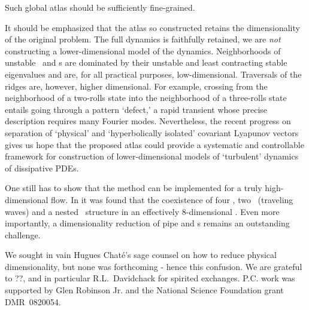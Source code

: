 Such global atlas should be sufficiently fine-grained.

It should be emphasized that the atlas so constructed retains the
dimensionality of the original problem. The full dynamics is faithfully
retained, we are \emph{not} constructing a lower-dimensional model of the
dynamics. Neighborhoods of unstable \eqva\ and \po s are dominated by
their unstable and least contracting stable eigenvalues and are, for all
practical purposes, low-dimensional. Traversals of the ridges are,
however, higher dimensional. For example, crossing from the neighborhood
of a two-rolls state into the neighborhood of a three-rolls state entails
going through a pattern `defect,' a rapid transient whose precise
description requires many Fourier modes. Nevertheless, the recent
progress on separation of `physical' and `hyperbolically isolated'
covariant Lyapunov
vectors gives us
hope that the proposed atlas could provide a systematic and controllable
framework for construction of lower-dimensional models of `turbulent'
dynamics of dissipative PDEs.

One still has to show that the method can be implemented for a truly
high-dimensional flow. In  it was found that the
coexistence of four \eqva, two \reqva\ (traveling waves) and a nested
\fixedsp\ structure in an effectively $8$-dimensional \KS. Even more
importantly, a dimensionality reduction of pipe and \pCf s remains an
outstanding challenge.


	\medskip
We sought in vain Hugues Chat\'e's sage counsel on how to reduce
physical dimensionality, but none was forthcoming - hence this
confusion.
We are grateful to
??,
and in particular R.L.~Davidchack
for spirited exchanges.
P.C. work was supported by  Glen Robinson Jr.
and the National Science Foundation grant
DMR~0820054. 	



\Remarks


